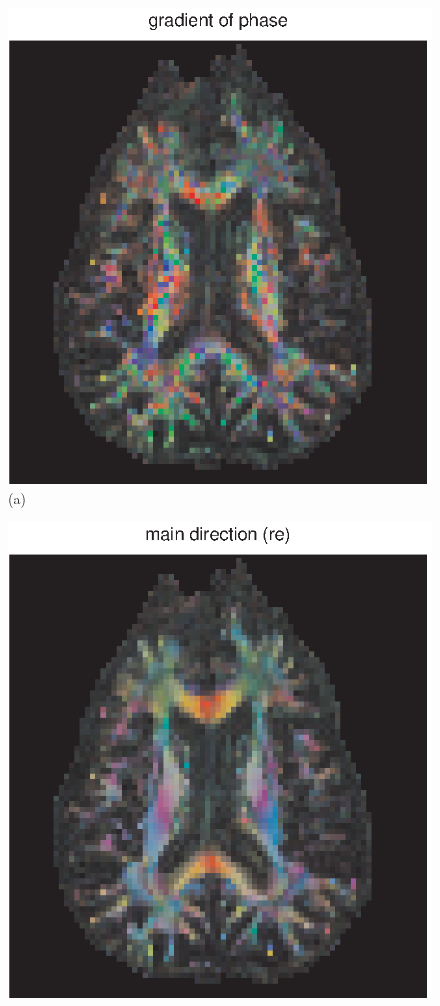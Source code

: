 \documentclass[authoryear,preprint,12pt]{elsarticle}
\begin{document}
\begin{figure}[p]
  \begin{center}
      \begin{minipage}[]{0.42\textwidth}
      \centering
      \includegraphics[width=\textwidth]{gradphase55any.eps}
       (a)
    \end{minipage}
      \begin{minipage}[]{0.42\textwidth}
      \centering
      \includegraphics[width=\textwidth]{tensdir55ny.eps}

\end{minipage}
\end{center}
\end{figure}
\end{document}
